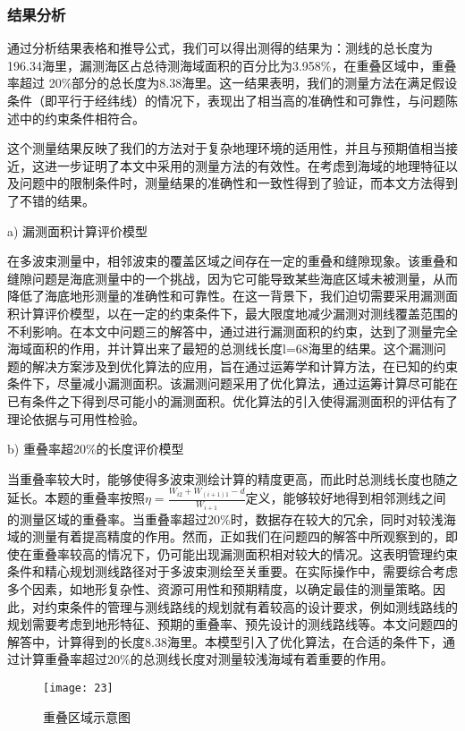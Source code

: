 \documentclass[withoutpreface,bwprint]{cumcmthesis} %
\begin{document}
\subsubsection{结果分析}
通过分析结果表格和推导公式，我们可以得出测得的结果为：测线的总长度为196.34海里，漏测海区占总待测海域面积的百分比为3.958\%，在重叠区域中，重叠率超过 20\%部分的总长度为8.38海里。这一结果表明，我们的测量方法在满足假设条件（即平行于经纬线）的情况下，表现出了相当高的准确性和可靠性，与问题陈述中的约束条件相符合。

这个测量结果反映了我们的方法对于复杂地理环境的适用性，并且与预期值相当接近，这进一步证明了本文中采用的测量方法的有效性。在考虑到海域的地理特征以及问题中的限制条件时，测量结果的准确性和一致性得到了验证，而本文方法得到了不错的结果。

a) 漏测面积计算评价模型

在多波束测量中，相邻波束的覆盖区域之间存在一定的重叠和缝隙现象。该重叠和缝隙问题是海底测量中的一个挑战，因为它可能导致某些海底区域未被测量，从而降低了海底地形测量的准确性和可靠性。在这一背景下，我们迫切需要采用漏测面积计算评价模型，以在一定的约束条件下，最大限度地减少漏测对测线覆盖范围的不利影响。在本文中问题三的解答中，通过进行漏测面积的约束，达到了测量完全海域面积的作用，并计算出来了最短的总测线长度l=68海里的结果。这个漏测问题的解决方案涉及到优化算法的应用，旨在通过运筹学和计算方法，在已知的约束条件下，尽量减小漏测面积。该漏测问题采用了优化算法，通过运筹计算尽可能在已有条件之下得到尽可能小的漏测面积。优化算法的引入使得漏测面积的评估有了理论依据与可用性检验。

b) 重叠率超20\%的长度评价模型

当重叠率较大时，能够使得多波束测绘计算的精度更高，而此时总测线长度也随之延长。本题的重叠率按照$\eta=\frac{W_{i2}+W_{(i+1)1}-d}{W_{i+1}}$定义，能够较好地得到相邻测线之间的测量区域的重叠率。当重叠率超过20\%时，数据存在较大的冗余，同时对较浅海域的测量有着提高精度的作用。然而，正如我们在问题四的解答中所观察到的，即使在重叠率较高的情况下，仍可能出现漏测面积相对较大的情况。这表明管理约束条件和精心规划测线路径对于多波束测绘至关重要。在实际操作中，需要综合考虑多个因素，如地形复杂性、资源可用性和预期精度，以确定最佳的测量策略。因此，对约束条件的管理与测线路线的规划就有着较高的设计要求，例如测线路线的规划需要考虑到地形特征、预期的重叠率、预先设计的测线路线等。本文问题四的解答中，计算得到的长度8.38海里。本模型引入了优化算法，在合适的条件下，通过计算重叠率超过20\%的总测线长度对测量较浅海域有着重要的作用。
\begin{figure}[H]
    \centering
    \texttt{[image: 23]}
    \caption{重叠区域示意图}
    \label{fig:four}
\end{figure}
\end{document}
